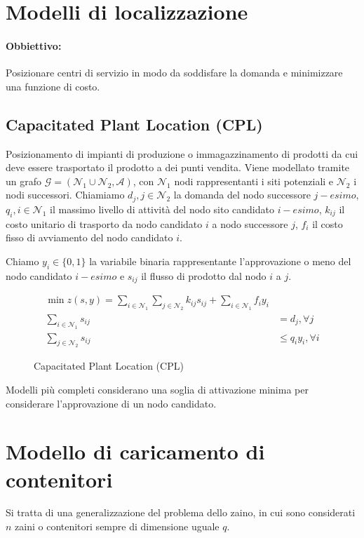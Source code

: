 \documentclass[\main/main.tex]{subfiles}
\begin{document}
\section{Modelli di localizzazione}
\paragraph*{Obbiettivo:} Posizionare centri di servizio in modo da soddisfare la domanda e minimizzare una funzione di costo.

\subsection{Capacitated Plant Location (CPL)}
Posizionamento di impianti di produzione o immagazzinamento di prodotti da cui deve essere trasportato il prodotto a dei punti vendita. Viene modellato tramite un grafo $\mathcal{G} = (\mathcal{N}_1 \cup \mathcal{N}_2, \mathcal{A})$, con $\mathcal{N}_1$ nodi rappresentanti i siti potenziali e $\mathcal{N}_2$ i nodi successori.
Chiamiamo $d_j, j \in \mathcal{N}_2$ la domanda del nodo successore $j-esimo$, $q_i, i \in \mathcal{N}_1$ il massimo livello di attività del nodo sito candidato $i-esimo$, $k_{ij}$ il costo unitario di trasporto da nodo candidato $i$ a nodo successore $j$, $f_i$ il costo fisso di avviamento del nodo candidato $i$.

Chiamo $y_i \in \{0,1\}$ la variabile binaria rappresentante l'approvazione o meno del nodo candidato $i-esimo$ e $s_{ij}$ il flusso di prodotto dal nodo $i$ a $j$.

\begin{figure}
  \begin{align*}
    \min z(s,y) = \sum_{i \in \mathcal{N}_1} \sum_{j \in \mathcal{N}_2} k_{ij}s_{ij} + \sum_{i \in \mathcal{N}_1} f_i y_i \\
    \sum_{i \in \mathcal{N}_1} s_{ij} & = d_j, \forall j                                                                  \\
    \sum_{j \in \mathcal{N}_2} s_{ij} & \leq q_iy_i, \forall i
  \end{align*}
  \caption{Capacitated Plant Location (CPL)}
\end{figure}

Modelli più completi considerano una soglia di attivazione minima per considerare l'approvazione di un nodo candidato.

\section{Modello di caricamento di contenitori}
Si tratta di una generalizzazione del problema dello zaino, in cui sono considerati $n$ zaini o contenitori sempre di dimensione uguale $q$.
\end{document}
